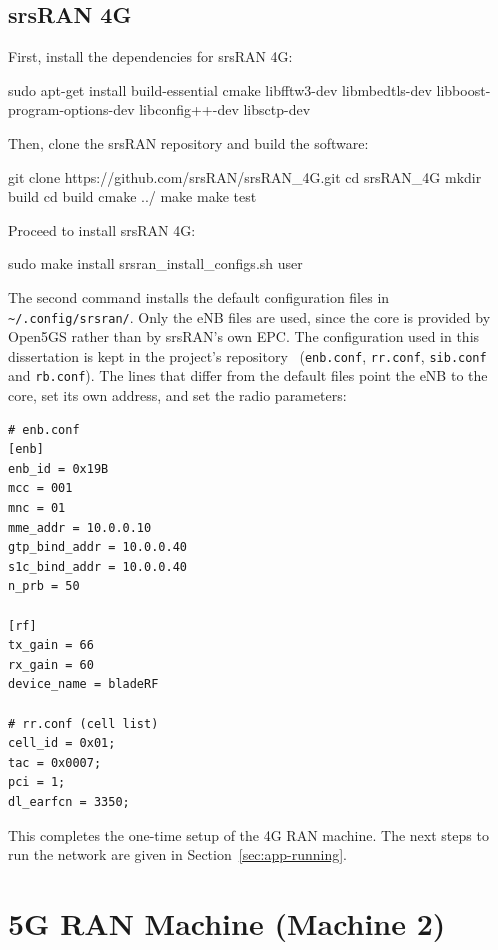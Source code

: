 \subsection{srsRAN 4G}
\label{sec:srsRAN_4G}
First, install the dependencies for srsRAN 4G:
\begin{code}
sudo apt-get install build-essential cmake libfftw3-dev libmbedtls-dev libboost-program-options-dev libconfig++-dev libsctp-dev
\end{code}
Then, clone the srsRAN repository and build the software:
\begin{code}
git clone https://github.com/srsRAN/srsRAN_4G.git
cd srsRAN_4G
mkdir build
cd build
cmake ../
make
make test
\end{code}
Proceed to install srsRAN 4G:
\begin{code}
sudo make install
srsran_install_configs.sh user
\end{code}

The second command installs the default configuration files in \texttt{\textasciitilde/.config/srsran/}. Only the \gls{eNB} files are used, since the core is provided by Open5GS rather than by srsRAN's own \gls{EPC}. The configuration used in this dissertation is kept in the project's repository~\cite{thesis_repo} (\texttt{enb.conf}, \texttt{rr.conf}, \texttt{sib.conf} and \texttt{rb.conf}). The lines that differ from the default files point the \gls{eNB} to the core, set its own address, and set the radio parameters:
\begin{verbatim}
# enb.conf
[enb]
enb_id = 0x19B
mcc = 001
mnc = 01
mme_addr = 10.0.0.10
gtp_bind_addr = 10.0.0.40
s1c_bind_addr = 10.0.0.40
n_prb = 50

[rf]
tx_gain = 66
rx_gain = 60
device_name = bladeRF

# rr.conf (cell list)
cell_id = 0x01;
tac = 0x0007;
pci = 1;
dl_earfcn = 3350;
\end{verbatim}

This completes the one-time setup of the 4G \gls{RAN} machine. The next steps to run the network are given in Section~\ref{sec:app-running}.


\section{5G RAN Machine (Machine 2)}
\label{sec:app-5g-ran}

